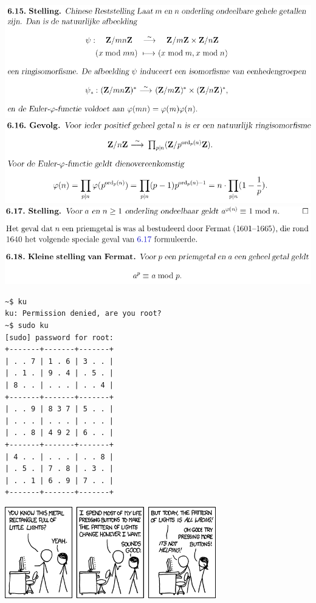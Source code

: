 \documentclass[10pt,a4paper,titlepage]{article}
\begin{document}
\includegraphics[width=\textwidth]{Selection_259}\\
\includegraphics[width=\textwidth]{Selection_260}\\
\includegraphics[width=\textwidth]{Selection_261}\\


\begin{center}
\begin{lstlisting}[frame=single, numbers=none, deletekeywords={for}]
~$ ku
ku: Permission denied, are you root?
~$ sudo ku
[sudo] password for root:
+-------+-------+-------+
| . . 7 | 1 . 6 | 3 . . | 
| . 1 . | 9 . 4 | . 5 . | 
| 8 . . | . . . | . . 4 | 
+-------+-------+-------+    
| . . 9 | 8 3 7 | 5 . . |    
| . . . | . . . | . . . | 
| . . 8 | 4 9 2 | 6 . . | 
+-------+-------+-------+
| 4 . . | . . . | . . 8 |
| . 5 . | 7 . 8 | . 3 . |
| . . 1 | 6 . 9 | 7 . . |
+-------+-------+-------+ 
\end{lstlisting}
\end{center}

\vfill
\begin{center}
\includegraphics[height=150px]{XKCD0722.png}
\end{center}
\end{document}
